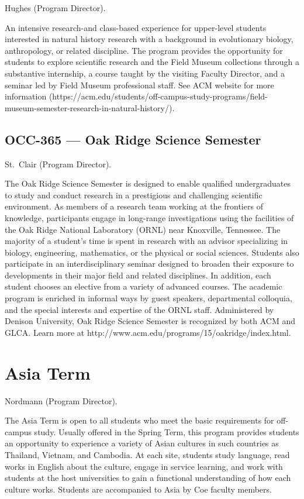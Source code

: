 \documentclass[
  letterpaper,
]{scrbook}
\begin{document}
Hughes (Program Director).

An intensive research-and class-based experience for upper-level
students interested in natural history research with a background in
evolutionary biology, anthropology, or related discipline. The program
provides the opportunity for students to explore scientific research and
the Field Museum collections through a substantive internship, a course
taught by the visiting Faculty Director, and a seminar led by Field
Museum professional staff. See ACM website for more information
(https://acm.edu/students/off-campus-study-programs/field-museum-semester-research-in-natural-history/).

\subsection{OCC-365 --- Oak Ridge Science
Semester}\label{occ-365-oak-ridge-science-semester}

St.~Clair (Program Director).

The Oak Ridge Science Semester is designed to enable qualified
undergraduates to study and conduct research in a prestigious and
challenging scientific environment. As members of a research team
working at the frontiers of knowledge, participants engage in long-range
investigations using the facilities of the Oak Ridge National Laboratory
(ORNL) near Knoxville, Tennessee. The majority of a student's time is
spent in research with an advisor specializing in biology, engineering,
mathematics, or the physical or social sciences. Students also
participate in an interdisciplinary seminar designed to broaden their
exposure to developments in their major field and related disciplines.
In addition, each student chooses an elective from a variety of advanced
courses. The academic program is enriched in informal ways by guest
speakers, departmental colloquia, and the special interests and
expertise of the ORNL staff. Administered by Denison University, Oak
Ridge Science Semester is recognized by both ACM and GLCA. Learn more at
http://www.acm.edu/programs/15/oakridge/index.html.

\section{Asia Term}\label{sec-asia-term}

Nordmann (Program Director).

The Asia Term is open to all students who meet the basic requirements
for off-campus study. Usually offered in the Spring Term, this program
provides students an opportunity to experience a variety of Asian
cultures in such countries as Thailand, Vietnam, and Cambodia. At each
site, students study language, read works in English about the culture,
engage in service learning, and work with students at the host
universities to gain a functional understanding of how each culture
works. Students are accompanied to Asia by Coe faculty members.
\end{document}
